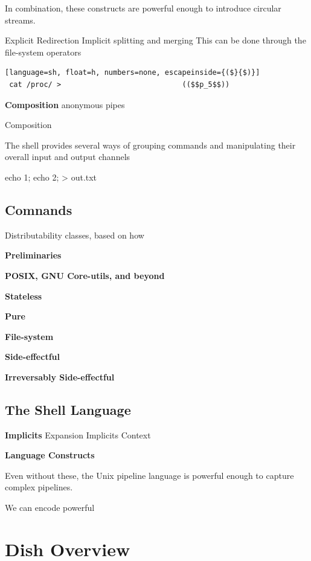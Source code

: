 \documentclass[sigplan,10pt,review,anonymous]{acmart}
\newcommand{\heading}[1]{\vspace{4pt}\noindent\textbf{#1}\enspace}
\begin{document}
In combination, these constructs are powerful enough to introduce circular streams. %

Explicit Redirection
Implicit splitting and merging 
This can be done through the file-system operators 

\begin{lstlisting}[language=sh, float=h, numbers=none, escapeinside={($}{$)}]
 cat /proc/ >                            (($$p_5$$))
\end{lstlisting}

\heading{Composition}
anonymous pipes

Composition

The shell provides several ways of grouping commands and manipulating their
overall input and output channels 

{ echo 1; echo 2; } > out.txt

\subsection{Comnands}
\label{bg:cmd}


Distributability classes, based on how 

\heading{Preliminaries}

\heading{POSIX, GNU Core-utils, and beyond}

\heading{Stateless}

\heading{Pure}

\heading{File-system}

\heading{Side-effectful}

\heading{Irreversably Side-effectful}

\subsection{The Shell Language}
\label{bg:shell}

\heading{Implicits}
Expansion
Implicits
Context

\heading{Language Constructs}

Even without these, the Unix pipeline language is powerful enough to capture complex pipelines.

We can encode powerful

\section{Dish Overview}
\end{document}
